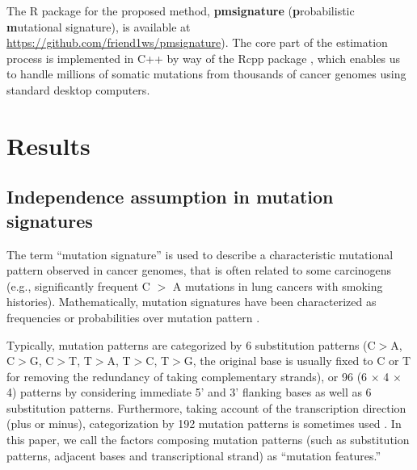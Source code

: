 
The R package for the proposed method,  {\bf pmsignature} ({\bf p}robabilistic {\bf m}utational signature),
is available at \url{https://github.com/friend1ws/pmsignature}).
The core part of the estimation process is implemented in C++ by way of the Rcpp package \cite{eddelbuettel2011rcpp},
which enables us to handle millions of somatic mutations from thousands of cancer genomes using standard desktop computers.






\section*{Results}


\subsection*{Independence assumption in mutation signatures}

The term ``mutation signature'' is used to describe a characteristic mutational pattern observed in cancer genomes, 
that is often related to some carcinogens
(e.g., significantly frequent C $>$ A mutations in lung cancers with smoking histories).
Mathematically, mutation signatures have been characterized as frequencies or probabilities over mutation pattern \cite{pmid23318258,pmid23628380}. 

Typically, mutation patterns are categorized 
by 6 substitution patterns (C$>$A, C$>$G, C$>$T, T$>$A, T$>$C, T$>$G, the original base is usually fixed to C or T for removing the redundancy of taking complementary strands),
or 96 (6 $\times$ 4 $\times$ 4) patterns by considering immediate 5' and 3' flanking bases as well as 6 substitution patterns.
Furthermore, taking account of the transcription direction (plus or minus), 
categorization by 192 mutation patterns is sometimes used \cite{pmid23945592, pmid23318258}.
In this paper, we call the factors composing mutation patterns (such as substitution patterns, adjacent bases and transcriptional strand) 
as ``mutation features.''

